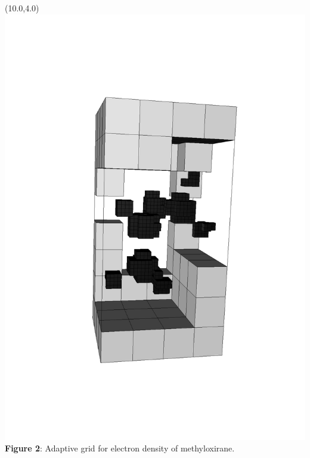 \documentclass[a0,portrait]{a0poster}
\begin{document}
\begin{textblock}{7.0}(10.0,4.0)
    \includegraphics[angle=-90, scale=1.40, viewport = 170 150 470 700, clip]{figures/grid.pdf}
    \footnotesize
    \centering
    \\\textbf{Figure 2}: Adaptive grid for electron density of methyloxirane.
\end{textblock} 
\end{document}
